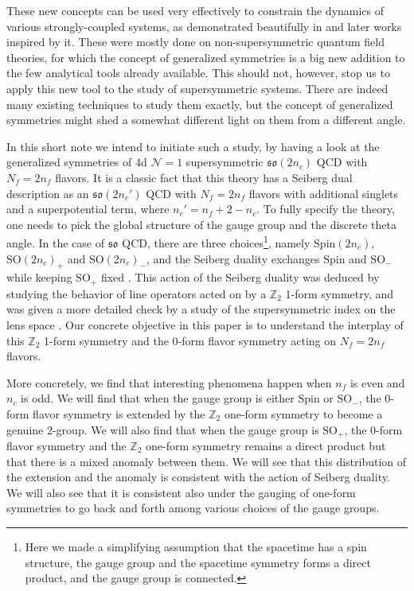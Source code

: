 \documentclass[12pt]{article}
\numberwithin{equation}{section}
\newcommand*{\bZ}{\mathbb{Z}}
\def\Nequals#1{$\mathcal{N}{=}#1$}
\def\SO{\mathrm{SO}}
\def\Spin{\mathrm{Spin}}
\begin{document}
These new concepts can be used very effectively to constrain the dynamics of various strongly-coupled systems,
as demonstrated beautifully in \cite{Gaiotto:2017yup} and later works inspired by it.
These were mostly done on non-supersymmetric quantum field theories,
for which the concept of generalized symmetries is a big new addition to the few analytical tools already available.
This should not, however, stop us to apply this new tool to the study of supersymmetric systems.
There are indeed  many existing techniques to study them exactly,
but the concept of generalized symmetries might shed a somewhat different light on them from a different angle.

In this short note we intend to initiate such a study, 
by having a look at the generalized symmetries of 4d \Nequals1 supersymmetric $\mathfrak{so}(2n_c)$ QCD with $N_f=2n_f$ flavors.
It is  a classic fact \cite{Intriligator:1995id} that this theory has a Seiberg dual description as an $\mathfrak{so}(2n_c')$ QCD with $N_f=2n_f$ flavors with additional singlets and a superpotential term, where $n_c'=n_f+2-n_c$.
To fully specify the theory, one needs to pick the global structure of the gauge group and the discrete theta angle.
In the case of $\mathfrak{so}$ QCD,
there are three choices\footnote{%
Here we made a simplifying assumption that the spacetime has a spin structure,
the gauge group and the spacetime symmetry forms a direct product,
and the gauge group is connected.
}, namely $\Spin(2n_c)$, $\SO(2n_c)_+$ and $\SO(2n_c)_-$,
and the Seiberg duality exchanges $\Spin$ and $\SO_-$ while keeping $\SO_+$ fixed \cite{Aharony:2013hda}.
This action of the Seiberg duality was deduced by studying the behavior of line operators acted on by a $\bZ_2$ 1-form symmetry,
and was given a more detailed check by a study of the supersymmetric index on the lens space \cite{Razamat:2013opa}.
Our concrete objective in this paper is to understand the interplay of this $\bZ_2$ 1-form symmetry and the 0-form flavor symmetry acting on $N_f=2n_f$ flavors.

More concretely, we find that interesting phenomena happen when $n_f$ is even and $n_c$ is odd.
We will find that when the gauge group is either $\Spin$ or $\SO_-$, the 0-form flavor symmetry is extended by the $\bZ_2$ one-form symmetry to become a genuine 2-group.
We will also find that when the gauge group is $\SO_+$, the 0-form flavor symmetry
and the $\bZ_2$ one-form symmetry remains a direct product
but that there is a mixed anomaly between them.
We will see that this distribution of the extension and the anomaly is consistent with the action of Seiberg duality.
We will also see that it is consistent also under the gauging of one-form symmetries to go back and forth among various choices of the gauge groups. 
\end{document}
